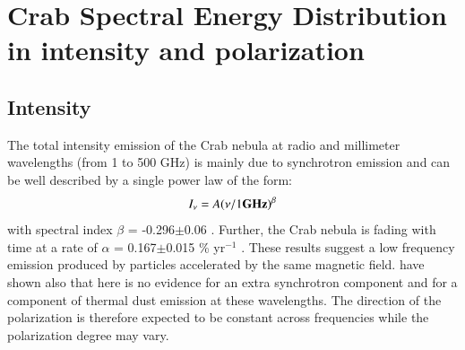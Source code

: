 \documentclass[twocolumn,traditabstract]{aa}
\def\NIKA{\textit{NIKA}}
\def\Planck{\textit{Planck}}
\def\WMAP{\textit{WMAP}}
\begin{document}


\section{Crab Spectral Energy Distribution in intensity and polarization}\label{sec:Polarization intensity Spectral Energy Density (SED)}
\subsection{Intensity}
The total intensity emission of the Crab nebula at radio and millimeter wavelengths (from 1 to 500 GHz) is mainly due to synchrotron emission and can be well described by a single power law of the form:
\begin{equation}
I_{\nu} = A(\nu / 1 {\bf GHz})^{\beta}
\end{equation}\label{eq:sync}
with spectral index $\beta$ = -0.296$\pm$0.06 \citep{baars1977absolute,macias2010}. Further, the Crab nebula is fading with time at a rate of $\alpha$ = 0.167$\pm$0.015 \% yr$^{-1}$ \citep{aller1985decrease}. 
These results suggest a low frequency emission produced by particles accelerated by the same magnetic field. \cite{macias2010} have shown also that here is no evidence for an extra synchrotron component and for a component of thermal dust emission at these wavelengths. The direction of the polarization is therefore expected to be constant across frequencies while the polarization degree may vary.
\end{document}

